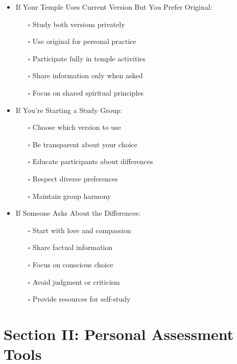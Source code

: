 \documentclass[11pt,twoside]{book}
\begin{document}
\begin{itemize}
\begin{itemize}
\item If Your Temple Uses Current Version But You Prefer Original:
\label{sec:org88c8410}
\begin{itemize}
\item[{$\square$}] Study both versions privately
\item[{$\square$}] Use original for personal practice
\item[{$\square$}] Participate fully in temple activities
\item[{$\square$}] Share information only when asked
\item[{$\square$}] Focus on shared spiritual principles
\end{itemize}
\item If You're Starting a Study Group:
\label{sec:orgf8c9e5a}
\begin{itemize}
\item[{$\square$}] Choose which version to use
\item[{$\square$}] Be transparent about your choice
\item[{$\square$}] Educate participants about differences
\item[{$\square$}] Respect diverse preferences
\item[{$\square$}] Maintain group harmony
\end{itemize}
\item If Someone Asks About the Differences:
\label{sec:org324099c}
\begin{itemize}
\item[{$\square$}] Start with love and compassion
\item[{$\square$}] Share factual information
\item[{$\square$}] Focus on conscious choice
\item[{$\square$}] Avoid judgment or criticism
\item[{$\square$}] Provide resources for self-study
\end{itemize}
\end{itemize}
\end{itemize}
\section*{Section II: Personal Assessment Tools}
\label{sec:org7162543}
\end{document}

